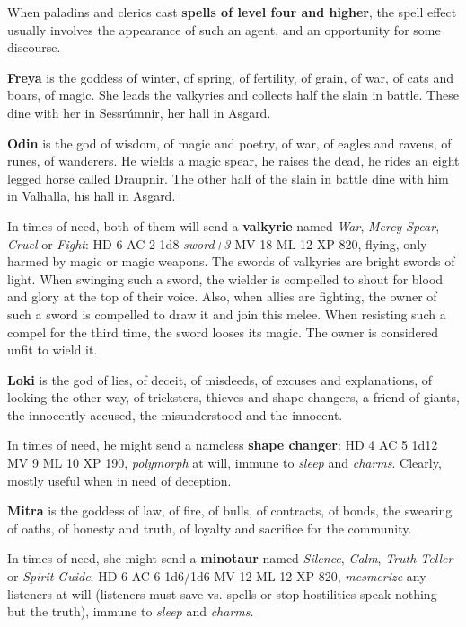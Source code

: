 \documentclass[11pt]{bxart}
\begin{document}
When paladins and clerics cast \textbf{spells of level four and higher}, the spell effect usually involves the appearance of such an agent, and an opportunity for some discourse.

\textbf{Freya} is the goddess of winter, of spring, of fertility, of grain, of war, of cats and boars, of magic. She leads the valkyries and collects half the slain in battle. These dine with her in Sessrúmnir, her hall in Asgard.

\textbf{Odin} is the god of wisdom, of magic and poetry, of war, of eagles and ravens, of runes, of wanderers. He wields a magic spear, he raises the dead, he rides an eight legged horse called Draupnir. The other half of the slain in battle dine with him in Valhalla, his hall in Asgard.

In times of need, both of them will send a \textbf{valkyrie} named \textit{War}, \textit{Mercy} \textit{Spear}, \textit{Cruel} or \textit{Fight}: HD 6 AC 2 1d8 \textit{sword+3} MV 18 ML 12 XP 820, flying, only harmed by magic or magic weapons. The swords of valkyries are bright swords of light. When swinging such a sword, the wielder is compelled to shout for blood and glory at the top of their voice. Also, when allies are fighting, the owner of such a sword is compelled to draw it and join this melee. When resisting such a compel for the third time, the sword looses its magic. The owner is considered unfit to wield it.

\textbf{Loki} is the god of lies, of deceit, of misdeeds, of excuses and explanations, of looking the other way, of tricksters, thieves and shape changers, a friend of giants, the innocently accused, the misunderstood and the innocent.

In times of need, he might send a nameless \textbf{shape changer}: HD 4 AC 5 1d12 MV 9 ML 10 XP 190, \textit{polymorph} at will, immune to \textit{sleep} and \textit{charms}. Clearly, mostly useful when in need of deception.

\textbf{Mitra} is the goddess of law, of fire, of bulls, of contracts, of bonds, the swearing of oaths, of honesty and truth, of loyalty and sacrifice for the community. 

In times of need, she might send a \textbf{minotaur} named \textit{Silence}, \textit{Calm}, \textit{Truth Teller} or \textit{Spirit Guide}: HD 6 AC 6 1d6/1d6 MV 12 ML 12 XP 820, \textit{mesmerize} any listeners at will (listeners must save vs. spells or stop hostilities speak nothing but the truth), immune to \textit{sleep} and \textit{charms}.
\end{document}

